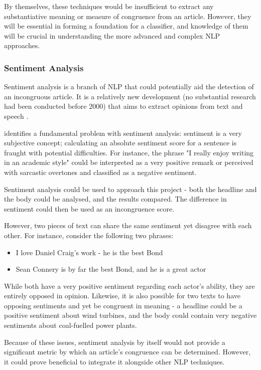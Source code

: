 By themselves, these techniques would be insufficient to extract any substantiative meaning or measure of congruence from an article. However, they will be essential in forming a foundation for a classifier, and knowledge of them will be crucial in understanding the more advanced and complex NLP approaches.

\subsubsection{Sentiment Analysis}\label{lit:sentiment-analysis}
Sentiment analysis is a branch of NLP that could potentially aid the detection of an incongruous article. It is a relatively new development (no substantial research had been conducted before 2000) that aims to extract opinions from text and speech \cite{liu2012}.

 identifies a fundamental problem with sentiment analysis: sentiment is a very subjective concept; calculating an absolute sentiment score for a sentence is fraught with potential difficulties. For instance, the phrase "I really enjoy writing in an academic style" could be interpreted as a very positive remark or perceived with sarcastic overtones and classified as a negative sentiment.

Sentiment analysis could be used to approach this project - both the headline and the body could be analysed, and the results compared. The difference in sentiment could then be used as an incongruence score.

However, two pieces of text can share the same sentiment yet disagree with each other. For instance, consider the following two phrases:

\begin{itemize}
	\item I love Daniel Craig's work - he is the best Bond
	\item Sean Connery is by far the best Bond, and he is a great actor
\end{itemize}

While both have a very positive sentiment regarding each actor's ability, they are entirely opposed in opinion. Likewise, it is also possible for two texts to have opposing sentiments and yet be congruent in meaning - a headline could be a positive sentiment about wind turbines, and the body could contain very negative sentiments about coal-fuelled power plants.

Because of these issues, sentiment analysis by itself would not provide a significant metric by which an article's congruence can be determined. However, it could prove beneficial to integrate it alongside other NLP techniques. 

